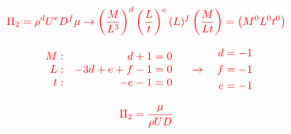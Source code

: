 \documentclass[t]{beamer}
\begin{document}
\begin{frame}
\frametitle{}
{\color{red}{El segundo grupo adimensional se construye de igual forma:}}
$$\color{red}{
\Pi_{2}=\rho^{d} U^{e} D^{f} \mu \rightarrow\left(\frac{M}{L^{3}}\right)^{d}\left(\frac{L}{t}\right)^{e}(L)^{f}\left(\frac{M}{Lt}\right)=\left(M^{0} L^{0} t^{0}\right)
}$$
    
$$\color{red}{
\begin{array}{rr}
M: & d+1=0 \\
L: & -3 d+e+f-1=0 \\
t: & -e-1=0
\end{array}\quad \rightarrow\quad \begin{aligned}
d &=-1 \\
f & =-1 \\
e &= -1
\end{aligned}
}$$

{\color{red}{Entonces:}}

$$\color{red}{
\Pi_{2}=\frac{\mu}{\rho U D}
}$$  
\end{frame}
\end{document}
